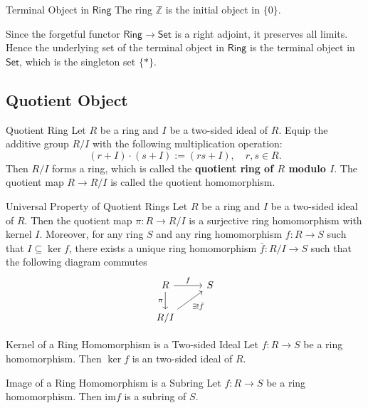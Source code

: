 \begin{proposition}{Terminal Object in $\mathsf{Ring}$}{}
    The ring $\mathbb{Z}$ is the initial object in $\{0\}$.
\end{proposition}

Since the forgetful functor $\mathsf{Ring}\to\mathsf{Set}$ is a right adjoint, it preserves all limits. Hence the underlying set of the terminal object in $\mathsf{Ring}$ is the terminal object in $\mathsf{Set}$, which is the singleton set $\{*\}$.



\subsection{Quotient Object}
\begin{definition}{Quotient Ring}{}
    Let $R$ be a ring and $I$ be a two-sided ideal of $R$. Equip the additive group \( R / I \) with the following multiplication operation:
\[
(r+I) \cdot (s+I) := (rs + I), \quad r, s \in R .
\]
Then \( R / I \) forms a ring, which is called the \textbf{quotient ring of \( R \) modulo \( I \)}. The quotient map \( R \rightarrow R / I \) is called the quotient homomorphism.
\end{definition}

\begin{proposition}{Universal Property of Quotient Rings}{}
    Let $R$ be a ring and $I$ be a two-sided ideal of $R$. Then the quotient map $\pi:R\to R/I$ is a surjective ring homomorphism with kernel $I$. Moreover, for any ring $S$ and any ring homomorphism $f:R\to S$ such that $I\subseteq\ker f$, there exists a unique ring homomorphism $\bar{f}:R/I\to S$ such that the following diagram commutes
    \[
    \begin{tikzcd}[ampersand replacement=\&]
        R \arrow[r, "f"] \arrow[d, "\pi"'] \& S \\
        R/I \arrow[ru, "\exists!\bar{f}"'] \&  
    \end{tikzcd}
    \] 
\end{proposition}

\begin{proposition}{Kernel of a Ring Homomorphism is a Two-sided Ideal}{}
    Let $f:R\to S$ be a ring homomorphism. Then $\ker f$ is an two-sided ideal of $R$.
\end{proposition}

\begin{proposition}{Image of a Ring Homomorphism is a Subring}{}
    Let $f:R\to S$ be a ring homomorphism. Then $\mathrm{im}f$ is a subring of $S$.
\end{proposition}

